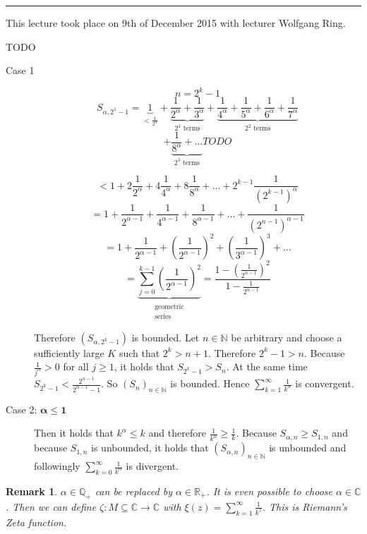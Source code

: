 \documentclass[a4paper,landscape,twocolumn]{article}
\newtheorem{rem}{Remark}
\newcommand\seq[1]{{\left(#1\right)}_{n \in \mathbb N}}
\newcommand\meta[3]{\hrule{} This #1 took place on #2 with lecturer #3.\par}
\begin{document}
\meta{lecture}{9th of December 2015}{Wolfgang Ring}

TODO

\begin{description}
  \item[Case 1]
    \[ n = 2^k - 1 \]
    \[ S_{\alpha,2^1-1} = \underbrace{1}_{<\frac{1}{2^\alpha}} + \underbrace{\frac1{2^\alpha} + \frac{1}{3^\alpha}}_{2^1 \text{ terms}} + \underbrace{\frac{1}{4^\alpha} + \frac{1}{5^\alpha} + \frac{1}{6^\alpha} + \frac{1}{7^\alpha}}_{2^2 \text{ terms}} \]
    \[ + \underbrace{\frac1{8^\alpha} + \dots}_{2^3 \text{ terms}} TODO \]

    \[ < 1 + 2 \frac{1}{2^\alpha} + 4 \frac{1}{4^\alpha} + 8 \frac{1}{8^\alpha} + \dots + 2^{k-1} \frac{1}{\left(2^{k-1}\right)^\alpha} \]
    \[ = 1 + \frac{1}{2^{\alpha-1}} + \frac{1}{4^{\alpha-1}} + \frac{1}{8^{\alpha-1}} + \dots + \frac{1}{\left(2^{n-1}\right)^{\alpha-1}} \]
    \[ = 1 + \frac{1}{2^{\alpha-1}} + \left(\frac{1}{2^{\alpha-1}}\right)^2 + \left(\frac{1}{3^{\alpha-1}}\right)^3 + \dots \]
    \[
      = \underbrace{\sum_{j=0}^{k-1} \left(\frac{1}{2^{\alpha-1}}\right)^2}_{\substack{\text{geometric} \\ \text{series}}}
      = \frac{1 - \left(\frac{1}{2^{\alpha-1}}\right)^2}{1 - \frac1{2^{\alpha-1}}}
    \]

    Therefore $(S_{\alpha,2^k-1})$ is bounded.
    Let $n \in \mathbb N$ be arbitrary and choose a sufficiently large $K$ such that $2^k > n+1$. Therefore $2^k-1 > n$.
    Because $\frac{1}{j^\alpha} > 0$ for all $j \geq 1$, it holds that $S_{2^k-1} > S_n$.
    At the same time $S_{2^k-1} < \frac{2^{\alpha-1}}{2^{\alpha-1}-1}$. So $\seq{S_n}$ is bounded.
    Hence $\sum_{k=1}^\infty \frac{1}{k^\alpha}$ is convergent.
  \item[Case 2: $\mathbf{\alpha \leq 1}$]
    Then it holds that $k^\alpha \leq k$ and therefore $\frac{1}{k^\alpha} \geq \frac1{k}$.
    Because $S_{\alpha,n} \geq S_{1,n}$ and because $S_{1,n}$ is unbounded, it holds that
    $\seq{S_{\alpha,n}}$ is unbounded and followingly $\sum_{k=0}^\infty \frac1{k^\alpha}$ is divergent.
\end{description}

\begin{rem}
  $\alpha \in \mathbb Q_+$ can be replaced by $\alpha \in \mathbb R_+$.
  It is even possible to choose $\alpha \in \mathbb C$.
  Then we can define $\zeta: M \subseteq \mathbb C \rightarrow \mathbb C$
  with $\xi(z) = \sum_{k=1}^\infty \frac{1}{k^z}$.
  This is Riemann's Zeta function.
\end{rem}
\end{document}

